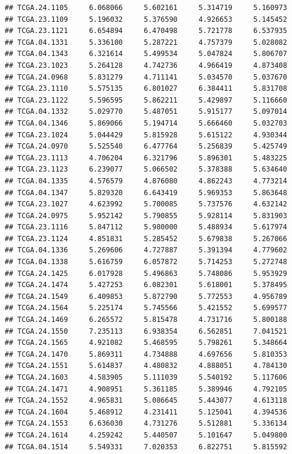 \documentclass[UTF8]{beamer}\usepackage[]{graphicx}\usepackage[]{color}
\makeatletter
\newenvironment{kframe}{%
 \def\at@end@of@kframe{}%
 \ifinner\ifhmode%
  \def\at@end@of@kframe{\end{minipage}}%
  \begin{minipage}{\columnwidth}%
 \fi\fi%
 \def\FrameCommand##1{\hskip\@totalleftmargin \hskip-\fboxsep
 \colorbox{shadecolor}{##1}\hskip-\fboxsep
     \hskip-\linewidth \hskip-\@totalleftmargin \hskip\columnwidth}%
 \MakeFramed {\advance\hsize-\width
   \@totalleftmargin\z@ \linewidth\hsize
   \@setminipage}}%
 {\par\unskip\endMakeFramed%
 \at@end@of@kframe}
\newenvironment{knitrout}{}{} %
\makeatother
\begin{document}
\begin{frame}[fragile]
\begin{knitrout}
\begin{kframe}
\begin{verbatim}
## TCGA.24.1105     6.068066     5.602161     5.314719     5.160973
## TCGA.23.1109     5.196032     5.376590     4.926653     5.145452
## TCGA.23.1121     6.654894     6.470498     5.721778     6.537935
## TCGA.04.1331     5.336100     5.287221     4.757379     5.028082
## TCGA.04.1343     6.321614     5.499534     5.047824     5.806707
## TCGA.23.1023     5.264128     4.742736     4.966419     4.873408
## TCGA.24.0968     5.831279     4.711141     5.034570     5.037670
## TCGA.23.1110     5.575135     6.801027     6.384411     5.831708
## TCGA.23.1122     5.596595     5.862211     5.429897     5.116660
## TCGA.04.1332     5.029770     5.487051     5.915177     5.097014
## TCGA.04.1346     5.869066     5.194714     5.666460     5.032703
## TCGA.23.1024     5.044429     5.815928     5.615122     4.930344
## TCGA.24.0970     5.525540     6.477764     5.256839     5.425749
## TCGA.23.1113     4.706204     6.321796     5.896301     5.483225
## TCGA.23.1123     6.239077     5.066502     5.378388     5.634640
## TCGA.04.1335     4.576579     4.876080     4.862243     4.773214
## TCGA.04.1347     5.829320     6.643419     5.969353     5.863648
## TCGA.23.1027     4.623992     5.700085     5.737576     4.632142
## TCGA.24.0975     5.952142     5.790855     5.928114     5.831903
## TCGA.23.1116     5.847112     5.980000     5.488934     5.617974
## TCGA.23.1124     4.851831     5.285452     5.679838     5.267066
## TCGA.04.1336     5.269606     4.727887     5.391394     4.779602
## TCGA.04.1338     5.616759     6.057872     5.714253     5.272748
## TCGA.24.1425     6.017928     5.496863     5.748086     5.953929
## TCGA.24.1474     5.427253     6.082301     5.618001     5.378495
## TCGA.24.1549     6.409853     5.872790     5.772553     4.956789
## TCGA.24.1564     5.225174     5.745566     5.421552     5.699577
## TCGA.24.1469     6.265572     5.815478     4.731716     5.800188
## TCGA.24.1550     7.235113     6.938354     6.562851     7.041521
## TCGA.24.1565     4.921082     5.468595     5.798261     5.348664
## TCGA.24.1470     5.869311     4.734888     4.697656     5.810353
## TCGA.24.1551     5.614837     4.480832     4.888051     4.784130
## TCGA.24.1603     4.583905     5.111039     5.540192     5.117606
## TCGA.24.1471     4.908951     5.361185     5.389946     4.792105
## TCGA.24.1552     4.965831     5.086645     5.443077     4.613118
## TCGA.24.1604     5.468912     4.231411     5.125041     4.394536
## TCGA.24.1553     6.636030     4.731276     5.512881     5.336134
## TCGA.24.1614     4.259242     5.440507     5.101647     5.049800
## TCGA.04.1514     5.549331     7.020353     6.822751     5.815592

\end{verbatim}
\end{kframe}
\end{knitrout}
\end{frame}
\end{document}
